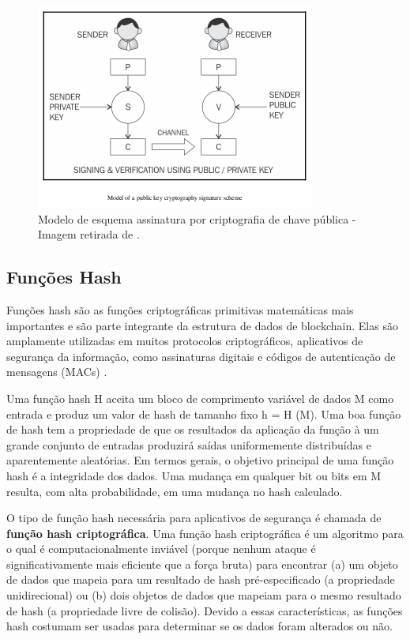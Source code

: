                     \begin{figure}[H]
                         \centering
                         \includegraphics[scale=0.7]{figuras/capitulo_2/public_private_signature.png}
                         \caption{Modelo de esquema assinatura por criptografia de chave pública - Imagem retirada de \cite{mastering_blockchain}.}
                         \label{fig:public_private_signature}
                    \end{figure}
                    
    \subsection{Funções Hash}
        
        Funções hash são as funções criptográficas primitivas matemáticas mais importantes e são parte integrante da estrutura de dados de blockchain. Elas são amplamente utilizadas em muitos protocolos criptográficos, aplicativos de segurança da informação, como assinaturas digitais e códigos de autenticação de mensagens (MACs) \cite{beginnig_blockchain_bikramaditya}.
        
        Uma função hash H aceita um bloco de comprimento variável de dados M como entrada e produz um valor de hash de tamanho fixo h = H (M). Uma boa função de hash tem a propriedade de que os resultados da aplicação da função à um grande conjunto de entradas produzirá saídas uniformemente distribuídas e aparentemente aleatórias. Em termos gerais, o objetivo principal de uma função hash é a integridade dos dados. Uma mudança em qualquer bit ou bits em M resulta, com alta probabilidade, em uma mudança no hash calculado.\cite{cryptograpy_and_network_stallings}
        
        O tipo de função hash necessária para aplicativos de segurança é chamada de \textbf{função hash criptográfica}. Uma função hash criptográfica é um algoritmo para o qual é computacionalmente inviável (porque nenhum ataque é significativamente mais eficiente que a força bruta) para encontrar (a) um objeto de dados que mapeia para um resultado de hash pré-especificado (a propriedade unidirecional) ou (b) dois objetos de dados que mapeiam para o mesmo resultado de hash (a propriedade livre de colisão). Devido a essas características, as funções hash costumam ser usadas para determinar se os dados foram alterados ou não.\cite{cryptograpy_and_network_stallings}

